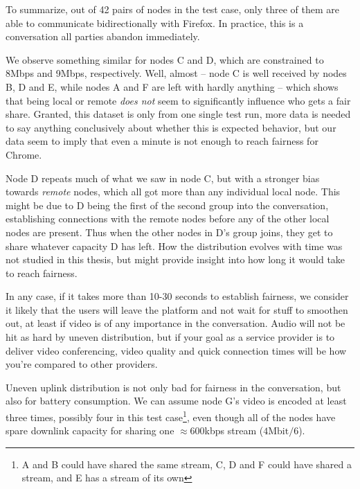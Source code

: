 To summarize, out of 42 pairs of nodes in the test case, only three of them are able to communicate bidirectionally with Firefox. In practice, this is a conversation all parties abandon immediately.

We observe something similar for nodes C and D, which are constrained to 8Mbps and 9Mbps, respectively. Well, almost -- node C is well received by nodes B, D and E, while nodes A and F are left with hardly anything -- which shows that being local or remote \emph{does not} seem to significantly influence who gets a fair share. Granted, this dataset is only from one single test run, more data is needed to say anything conclusively about whether this is expected behavior, but our data seem to imply that even a minute is not enough to reach fairness for Chrome.

Node D repeats much of what we saw in node C, but with a stronger bias towards \emph{remote} nodes, which all got more than any individual local node. This might be due to D being the first of the second group into the conversation, establishing connections with the remote nodes before any of the other local nodes are present. Thus when the other nodes in D's group joins, they get to share whatever capacity D has left. How the distribution evolves with time was not studied in this thesis, but might provide insight into how long it would take to reach fairness.

In any case, if it takes more than 10-30 seconds to establish fairness, we consider it likely that the users will leave the platform and not wait for stuff to smoothen out, at least if video is of any importance in the conversation. Audio will not be hit as hard by uneven distribution, but if your goal as a service provider is to deliver video conferencing, video quality and quick connection times will be how you're compared to other providers.

Uneven uplink distribution is not only bad for fairness in the conversation, but also for battery consumption. We can assume node G's video is encoded at least three times, possibly four in this test case\footnote{A and B could have shared the same stream, C, D and F could have shared a stream, and E has a stream of its own}, even though all of the nodes have spare downlink capacity for sharing one $\approx$600kbps stream ($4\text{Mbit}/6$).


